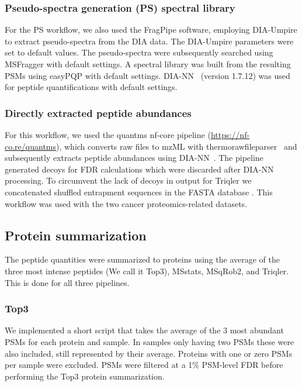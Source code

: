 \documentclass[10pt,letterpaper]{article}
\begin{document}
\subsubsection*{Pseudo-spectra generation (PS) spectral library}

For the PS workflow, we also used the FragPipe software, employing DIA-Umpire to extract pseudo-spectra from the DIA data. The DIA-Umpire parameters were set to default values. The pseudo-spectra were subsequently searched using MSFragger with default settings. A spectral library was built from the resulting PSMs using easyPQP with default settings. DIA-NN~\cite{demichev2020dia} (version 1.7.12) was used for peptide quantifications with default settings. 

\subsubsection*{Directly extracted peptide abundances}

For this workflow, we used the quantms nf-core pipeline (\url{https://nf-co.re/quantms}), which converts raw files to mzML with thermorawfileparser~\cite{hulstaert2019thermorawfileparser} and subsequently extracts peptide abundances using DIA-NN~\cite{hulstaert2019thermorawfileparser}. The pipeline generated decoys for FDR calculations which were discarded after DIA-NN processing. To circumvent the lack of decoys in output for Triqler we concatenated shuffled entrapment sequences in the FASTA database \cite{granholm2013determining}. This workflow was used with the two cancer proteomics-related datasets.

\subsection*{Protein summarization}

The peptide quantities were summarized to proteins using the average of the three most intense peptides (We call it Top3), MSstats, MSqRob2, and Triqler. This is done for all three pipelines. 

\subsubsection*{Top3}

We implemented a short script that takes the average of the 3 most abundant PSMs for each protein and sample. In samples only having two PSMs these were also included, still represented by their average. Proteins with one or zero PSMs per sample were excluded. PSMs were filtered at a 1\% PSM-level FDR before performing the Top3 protein summarization. 
\end{document}
